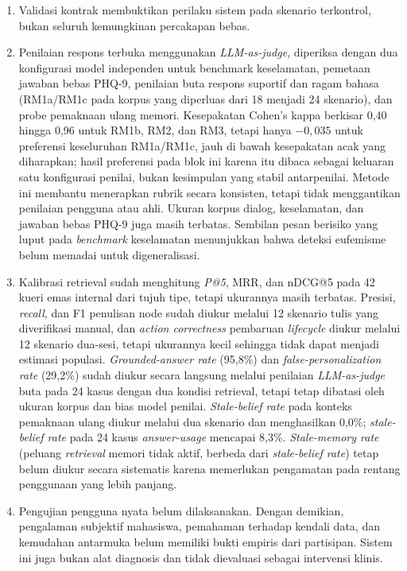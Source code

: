\begin{enumerate}[label=\arabic*.,leftmargin=*,itemsep=4pt]

    \item Validasi kontrak membuktikan perilaku sistem pada skenario terkontrol, bukan seluruh kemungkinan percakapan bebas. 
    
    \item Penilaian respons terbuka menggunakan \textit{LLM-as-judge}, diperiksa dengan dua konfigurasi model independen untuk benchmark keselamatan, pemetaan jawaban bebas PHQ-9, penilaian buta respons suportif dan ragam bahasa (RM1a/RM1c pada korpus yang diperluas dari 18 menjadi 24 skenario), dan probe pemaknaan ulang memori. Kesepakatan Cohen's kappa berkisar 0,40 hingga 0,96 untuk RM1b, RM2, dan RM3, tetapi hanya $-0,035$ untuk preferensi keseluruhan RM1a/RM1c, jauh di bawah kesepakatan acak yang diharapkan; hasil preferensi pada blok ini karena itu dibaca sebagai keluaran satu konfigurasi penilai, bukan kesimpulan yang stabil antarpenilai. Metode ini membantu menerapkan rubrik secara konsisten, tetapi tidak menggantikan penilaian pengguna atau ahli. Ukuran korpus dialog, keselamatan, dan jawaban bebas PHQ-9 juga masih terbatas. Sembilan pesan berisiko yang luput pada \textit{benchmark} keselamatan menunjukkan bahwa deteksi eufemisme belum memadai untuk digeneralisasi.

    \item Kalibrasi retrieval sudah menghitung \textit{P@5}, MRR, dan nDCG@5 pada 42 kueri emas internal dari tujuh tipe, tetapi ukurannya masih terbatas. Presisi, \textit{recall}, dan F1 penulisan node sudah diukur melalui 12 skenario tulis yang diverifikasi manual, dan \textit{action correctness} pembaruan \textit{lifecycle} diukur melalui 12 skenario dua-sesi, tetapi ukurannya kecil sehingga tidak dapat menjadi estimasi populasi. \textit{Grounded-answer rate} (95,8\%) dan \textit{false-personalization rate} (29,2\%) sudah diukur secara langsung melalui penilaian \textit{LLM-as-judge} buta pada 24 kasus dengan dua kondisi retrieval, tetapi tetap dibatasi oleh ukuran korpus dan bias model penilai. \textit{Stale-belief rate} pada konteks pemaknaan ulang diukur melalui dua skenario dan menghasilkan 0,0\%; \textit{stale-belief rate} pada 24 kasus \textit{answer-usage} mencapai 8,3\%. \textit{Stale-memory rate} (peluang \textit{retrieval} memori tidak aktif, berbeda dari \textit{stale-belief rate}) tetap belum diukur secara sistematis karena memerlukan pengamatan pada rentang penggunaan yang lebih panjang.
    
    \item Pengujian pengguna nyata belum dilaksanakan. Dengan demikian, pengalaman subjektif mahasiswa, pemahaman terhadap kendali data, dan kemudahan antarmuka belum memiliki bukti empiris dari partisipan. Sistem ini juga bukan alat diagnosis dan tidak dievaluasi sebagai intervensi klinis.
\end{enumerate}

